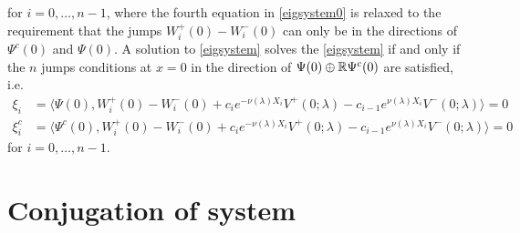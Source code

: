 \documentclass[thesis.tex]{subfiles}
\begin{document}
for $i = 0, \dots, n-1$, where the fourth equation in \cref{eigsystem0} is relaxed to the requirement that the jumps $W_i^+(0) - W_i^-(0)$ can only be in the directions of $\Psi^c(0)$ and $\Psi(0)$. A solution to \eqref{eigsystem} solves the \cref{eigsystem} if and only if the $n$ jumps conditions at $x = 0$ in the direction of $\Psi(0) \oplus \mathbb{R} \Psi^c(0)$ are satisfied, i.e.  
\begin{equation}\label{jumpxi1}
\begin{aligned}
\xi_i &= \langle \Psi(0), W_i^+(0) - W_i^-(0) + c_i e^{-\nu(\lambda)X_i}V^+(0; \lambda) - c_{i-1} e^{\nu(\lambda)X_i} V^-(0; \lambda) \rangle = 0  \\
\xi_i^c &= \langle \Psi^c(0), W_i^+(0) - W_i^-(0) + c_i e^{-\nu(\lambda)X_i}V^+(0; \lambda) - c_{i-1} e^{\nu(\lambda)X_i} V^-(0; \lambda) \rangle = 0 
\end{aligned}
\end{equation}
for $i = 0, \dots, n-1$. 

\section{Conjugation of system}
\end{document}
